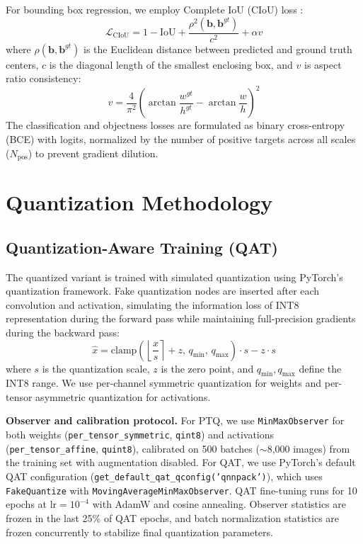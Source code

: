 \documentclass[conference]{IEEEtran}
\begin{document}
For bounding box regression, we employ Complete IoU (CIoU) loss \cite{zheng2020distance}:
\begin{equation}
\mathcal{L}_{\text{CIoU}} = 1 - \text{IoU} + \frac{\rho^2(\mathbf{b}, \mathbf{b}^{gt})}{c^2} + \alpha v
\end{equation}
where $\rho(\mathbf{b}, \mathbf{b}^{gt})$ is the Euclidean distance between predicted and ground truth centers, $c$ is the diagonal length of the smallest enclosing box, and $v$ is aspect ratio consistency:
\begin{equation}
v = \frac{4}{\pi^2}\left(\arctan\frac{w^{gt}}{h^{gt}} - \arctan\frac{w}{h}\right)^2
\end{equation}
The classification and objectness losses are formulated as binary cross-entropy (BCE) with logits, normalized by the number of positive targets across all scales ($N_{\text{pos}}$) to prevent gradient dilution.

\section{Quantization Methodology}

\subsection{Quantization-Aware Training (QAT)}
The quantized variant is trained with simulated quantization using PyTorch's quantization framework. Fake quantization nodes are inserted after each convolution and activation, simulating the information loss of INT8 representation during the forward pass while maintaining full-precision gradients during the backward pass:
\begin{equation}
\hat{x} = \text{clamp}\left(\left\lfloor \frac{x}{s} \right\rceil + z, \, q_{\min}, \, q_{\max}\right) \cdot s - z \cdot s
\end{equation}
where $s$ is the quantization scale, $z$ is the zero point, and $q_{\min}, q_{\max}$ define the INT8 range. We use per-channel symmetric quantization for weights and per-tensor asymmetric quantization for activations.

\textbf{Observer and calibration protocol.} For PTQ, we use \texttt{MinMaxObserver} for both weights (\texttt{per\_tensor\_symmetric}, \texttt{qint8}) and activations (\texttt{per\_tensor\_affine}, \texttt{quint8}), calibrated on 500 batches ($\sim$8,000 images) from the training set with augmentation disabled. For QAT, we use PyTorch's default QAT configuration (\texttt{get\_default\_qat\_qconfig('qnnpack')}), which uses \texttt{FakeQuantize} with \texttt{MovingAverageMinMaxObserver}. QAT fine-tuning runs for 10 epochs at $\text{lr}=10^{-4}$ with AdamW and cosine annealing. Observer statistics are frozen in the last 25\% of QAT epochs, and batch normalization statistics are frozen concurrently to stabilize final quantization parameters.
\end{document}
